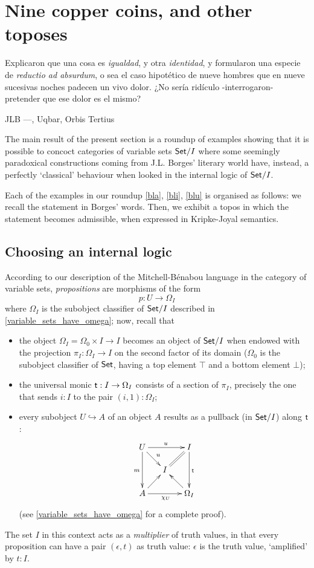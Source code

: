 \section{Nine copper coins, and other toposes}\label{sec_coins}
\epigraph{
  Explicaron que una cosa es \emph{igualdad}, y otra \emph{identidad}, y formularon una especie de \emph{reductio ad absurdum}, o sea el caso hipotético de nueve hombres que en nueve sucesivas noches padecen un vivo dolor. ¿No sería ridículo -interrogaron- pretender que ese dolor es el mismo?
}{JLB ---\tlon, Uqbar, Orbis Tertius}
The main result of the present section is a roundup of examples showing that it is possible to concoct categories of variable sets $\mathsf{Set}/I$ where some seemingly paradoxical constructions coming from J.L. Borges' literary world have, instead, a perfectly `classical' behaviour when looked in the internal logic of $\mathsf{Set}/I$.

Each of the examples in our roundup \autoref{bla}, \ref{bli}, \ref{blu} is organised as follows: we recall the statement in Borges' words. Then, we exhibit a topos in which the statement becomes admissible, when expressed in Kripke-Joyal semantics.
\subsection{Choosing an internal logic}
According to our description of the Mitchell-Bénabou language in the category of variable sets, \emph{propositions} are morphisms of the form
\[p : U \to \Omega_I\]
where $\Omega_I$ is the subobject classifier of $\mathsf{Set}/I$ described in \autoref{variable_sets_have_omega}; now, recall that
\begin{itemize}
  \item the object $\Omega_I = \Omega_0\times I \to I$ becomes an object of $\mathsf{Set}/I$ when endowed with the projection $\pi_I : \Omega_I \to I$ on the second factor of its domain ($\Omega_0$ is the subobject classifier of $\mathsf{Set}$, having a top element $\top$ and a bottom element $\bot$);
  \item the universal monic $\textsf{t} : I \to \Omega_I$ consists of a section of $\pi_I$, precisely the one that sends $i : I$ to the pair $(i,1) : \Omega_I$;
  \item every subobject $U \hookrightarrow A$ of an object $A$ results as a pullback (in $\mathsf{Set}/I$) along $\textsf{t}$:
        \[\xymatrix@R=5mm@C=5mm{
          U\ar[dr]^u\ar[rr]^u\ar[dd]_m&& I\ar[dd]^{\tr} \ar@{=}[dl]\\
          &I& \\
          A \ar[ur]\ar[rr]_{\chi_U}&& \ar[ul]\Omega_I
          }\]
        (see \autoref{variable_sets_have_omega} for a complete proof).
\end{itemize}
The set $I$ in this context acts as a \emph{multiplier} of truth values, in that every proposition can have a pair $(\epsilon, t)$ as truth value: $\epsilon$ is the truth value, `amplified' by $t : I$. 

